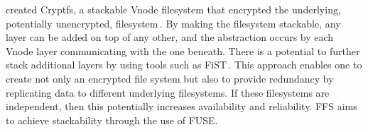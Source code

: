 \citeauthor{zadokCryptfsStackableVnode1998} created Cryptfs, a stackable Vnode filesystem that encrypted the underlying, potentially unencrypted, filesystem\,\cite{zadokCryptfsStackableVnode1998}. By making the filesystem stackable, any layer can be added on top of any other, and the abstraction occurs by each Vnode layer communicating with the one beneath. There is a potential to further stack additional layers by using tools such as FiST\,\cite{FiSTStackableFile}. This approach enables one to create not only an encrypted file system but also to provide redundancy by replicating data to different underlying filesystems. If these filesystems are independent, then this potentially increases availability and reliability. FFS aims to achieve stackability through the use of FUSE. 
